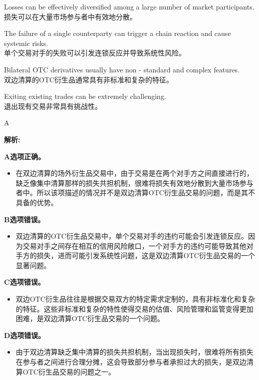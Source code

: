 \documentclass{article}
\newenvironment{explanation}
{\textbf{解析:}\par}
{\par}
\begin{document}
    \begin{choices}
        \item Losses can be effectively diversified among a large number of market participants.\\
        损失可以在大量市场参与者中有效地分散。
        \item The failure of a single counterparty can trigger a chain reaction and cause systemic risks.\\
        单个交易对手的失败可以引发连锁反应并导致系统性风险。
        \item Bilateral OTC derivatives usually have non - standard and complex features.\\
        双边清算的OTC衍生品通常具有非标准和复杂的特征。
        \item Exiting existing trades can be extremely challenging.\\
        退出现有交易非常具有挑战性。
    \end{choices}
    
    \begin{correctanswer}
        A
    \end{correctanswer}
    
    \begin{explanation}
    \textbf{A选项正确。}
    \begin{itemize}
        \item 在双边清算的场外衍生品交易中，由于交易是在两个对手方之间直接进行的，缺乏像集中清算那样的损失共担机制，很难将损失有效地分散到大量市场参与者中。所以该项描述的情况并不是双边清算OTC衍生品交易的问题，而是其不具备的优势。
    \end{itemize}
    \textbf{B选项错误。}
    \begin{itemize}
        \item 双边清算的OTC衍生品交易中，单个交易对手的违约可能会引发连锁反应。因为交易对手之间存在相互的信用风险敞口，一个对手方的违约可能导致其他对手方的损失，进而可能引发系统性问题，这是双边清算OTC衍生品交易的一个显著问题。
    \end{itemize}
    \textbf{C选项错误。}
    \begin{itemize}
        \item 双边OTC衍生品往往是根据交易双方的特定需求定制的，具有非标准化和复杂的特征。这些非标准和复杂的特性使得交易的估值、风险管理和监管变得更加困难，是双边清算OTC衍生品交易的一个问题。
    \end{itemize}
    \textbf{D选项错误。}
    \begin{itemize}
        \item 由于双边清算缺乏集中清算的损失共担机制，当出现损失时，很难将所有损失在参与者之间进行合理分摊，这会导致部分参与者承担过大的损失，是双边清算OTC衍生品交易的问题之一。
    \end{itemize}
    \end{explanation}
    
\end{document}
